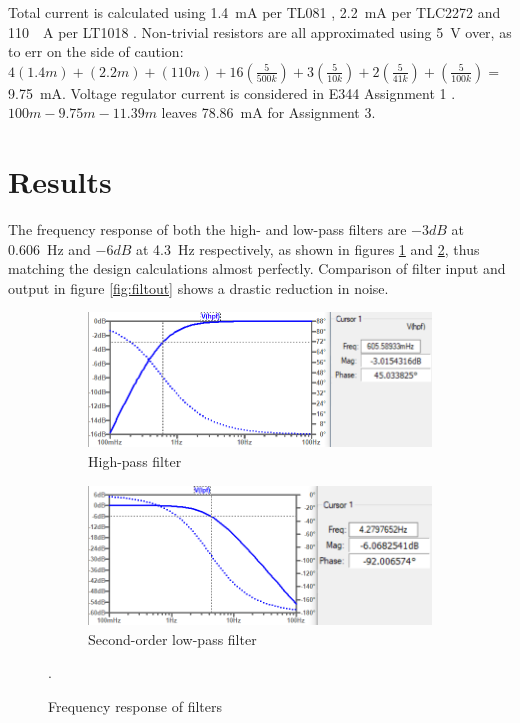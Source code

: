 Total current is calculated using \SI{1.4}{mA} per TL081 \cite{tl081}, \SI{2.2}{mA} per TLC2272 \cite{tlc2272} and \SI{110}{\mu A} per LT1018 \cite{lt1018}. Non-trivial resistors are all approximated using \SI{5}{V} over, as to err on the side of caution: $4(1.4m) + (2.2m) + (110n) + 16\left(\frac{5}{500k}\right) + 3\left(\frac{5}{10k}\right) +
 2\left(\frac{5}{41k}\right) + \left(\frac{5}{100k}\right) =$ \SI{9.75}{mA}. Voltage regulator current is considered in E344 Assignment 1 \cite{prev}. $100m - 9.75m - 11.39m$ leaves \SI{78.86}{mA} for Assignment 3.

\section{Results} \label{sec:heartResults}
The frequency response of both the high- and low-pass filters are $-3dB$ at \SI{0.606}{Hz} and $-6dB$ at \SI{4.3}{Hz} respectively, as shown in figures \ref{subfig:hpf} and \ref{subfig:lpf1}, thus matching the design calculations almost perfectly. Comparison of filter input and output in figure \ref{fig:filtout} shows a drastic reduction in noise. 

\begin{figure}[h]
 \footnotesize
   \centering
   \begin{subfigure}[]{0.48\textwidth}
        \includegraphics[width=\linewidth]{./Figures/hpf}
	  \caption{High-pass filter} \label{subfig:hpf}	
   \end{subfigure}
   \begin{subfigure}[]{0.48\textwidth}
  	 \includegraphics[width=\linewidth]{./Figures/lpf1}
	  \caption{Second-order low-pass filter} \label{subfig:lpf1}	
   \end{subfigure}
   \caption {Frequency response of filters}.
   \label{fig:freqreq}
 \end{figure}
  
